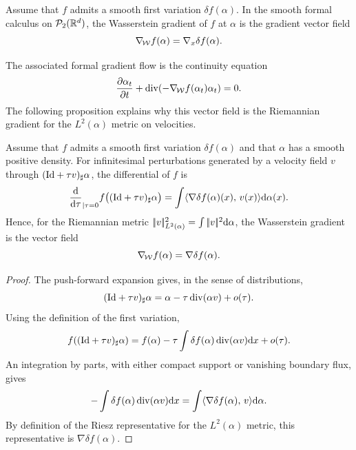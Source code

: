 \begin{defn}\label{def-wasserstein-gradient}
	Assume that $f$ admits a smooth first variation $\delta f(\alpha)$. In the smooth formal calculus on $\mathcal{P}_2(\mathbb{R}^d)$, the Wasserstein gradient of $f$ at $\alpha$ is the gradient vector field
	\begin{equation*}
	    \nabla_{\!\operatorname{\mathcal{W}}} f(\alpha) = \nabla_x \delta f(\alpha).
	\end{equation*}
\end{defn}
The associated formal gradient flow is the continuity equation
\begin{equation}
    \frac{\partial \alpha_t}{\partial t} + \operatorname{div}(-\nabla_{\!\operatorname{\mathcal{W}}} f(\alpha_t) \alpha_t) = 0. \label{eq:wassflow-pde}
\end{equation}
The following proposition explains why this vector field is the Riemannian gradient for the $L^2(\alpha)$ metric on velocities.
%
\begin{proposition}\label{prop-formal-wass-gradient}
	Assume that $f$ admits a smooth first variation $\delta f(\alpha)$ and that $\alpha$ has a smooth positive density. For infinitesimal perturbations generated by a velocity field $v$ through $(\mathrm{Id}+\tau v)_\sharp\alpha$, the differential of $f$ is
	\[
		\frac{\mathrm{d}}{\mathrm{d}\tau}_{|\tau=0}
		f\big((\mathrm{Id}+\tau v)_\sharp\alpha\big)
		=
		\int \langle \nabla \delta f(\alpha)(x),\,v(x)\rangle\mathrm{d}\alpha(x).
	\]
	Hence, for the Riemannian metric $|\!| v |\!|_{L^2(\alpha)}^2=\int |\!| v |\!|^2\mathrm{d}\alpha$, the Wasserstein gradient is the vector field
	\[
		\nabla_{\!\operatorname{\mathcal{W}}} f(\alpha)=\nabla \delta f(\alpha).
	\]
\end{proposition}
\begin{proof}
	The push-forward expansion gives, in the sense of distributions,
	\[
		(\mathrm{Id}+\tau v)_\sharp\alpha
		=
		\alpha-\tau\operatorname{div}(\alpha v)+o(\tau).
	\]
	Using the definition of the first variation,
	\[
		f((\mathrm{Id}+\tau v)_\sharp\alpha)
		=
		f(\alpha)-\tau\int \delta f(\alpha)\operatorname{div}(\alpha v)\mathrm{d} x+o(\tau).
	\]
	An integration by parts, with either compact support or vanishing boundary flux, gives
	\[
		-\int \delta f(\alpha)\operatorname{div}(\alpha v)\mathrm{d} x
		=
		\int \langle \nabla\delta f(\alpha),\,v\rangle\mathrm{d}\alpha.
	\]
	By definition of the Riesz representative for the $L^2(\alpha)$ metric, this representative is $\nabla\delta f(\alpha)$.
\end{proof}

